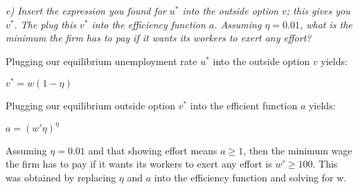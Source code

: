 \documentclass[11pt]{article} %
\begin{document}
\pagebreak
\textit{e) Insert the expression you found for $u^*$ into the outside option $v$; this
gives you $v^*$. The plug this $v^*$ into the efficiency function $a$. Assuming
$\eta=0.01$, what is the minimum the firm has to pay if it wants its
workers to exert any effort?}

\bigskip
Plugging our equilibrium unemployment rate $u^*$ into the outside option $v$ yields:
\begin{center}
$v^* = w(1 - \eta)$
\end{center}
Plugging our equilibrium outside option $v^*$ into the efficient function $a$ yields:
\begin{center}
$a = (w'\eta)^\eta$
\end{center}
Assuming $\eta = 0.01$ and that showing effort means $a ≥ 1$, then the minimum wage the firm has to pay if it wants its workers to exert any effort is $w' ≥ 100$. This was obtained by replacing $\eta$ and $a$ into the efficiency function and solving for w.
\end{document}
